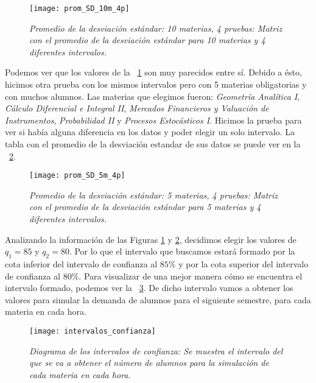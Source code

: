 \begin{figure}[H]
\centering
\texttt{[image: prom\_SD\_10m\_4p]} %
\caption[\textit{Promedio de la desviación estándar: 10 materias, 4 pruebas}]{\textit{Promedio de la desviación estándar: 10 materias, 4 pruebas: Matriz con el promedio de la desviación estándar para 10 materias y 4 diferentes intervalos.}}\label{promSD_10m_4p}
\end{figure}

Podemos ver que los valores de la \figurename{~\ref{promSD_10m_4p}} son muy parecidos entre sí. Debido a ésto, hicimos otra prueba con los mismos intervalos pero con 5 materias obligatorias y con muchos alumnos. Las materias que elegimos fueron: \textit{Geometría Analítica I}, \textit{Cálculo Diferencial e Integral II}, \textit{Mercados Financieros y Valuación de Instrumentos}, \textit{Probabilidad II} y \textit{Procesos Estocásticos I}. Hicimos la prueba para ver si había alguna diferencia en los datos y poder elegir un solo intervalo. La tabla con el promedio de la desviación estandar de sus datos se puede ver en la \figurename{~\ref{promSD_5m_4p}}.


\begin{figure}[H]
\centering
\texttt{[image: prom\_SD\_5m\_4p]} %
\caption[\textit{Promedio de la desviación estándar: 5 materias, 4 pruebas}]{\textit{Promedio de la desviación estándar: 5 materias, 4 pruebas: Matriz con el promedio de la desviación estándar para 5 materias y 4 diferentes intervalos.}}\label{promSD_5m_4p}
\end{figure}

Analizando la información de las Figuras \ref{promSD_10m_4p} y \ref{promSD_5m_4p}, decidimos elegir los valores de $q_{1} = 85$ y $q_{2} = 80$. Por lo que el intervalo que buscamos estará formado por la cota inferior del intervalo de confianza al $85\%$ y por la cota superior del intervalo de confianza al $80\%$. Para visualizar de una mejor manera cómo se encuentra el intervalo formado, podemos ver la \figurename{~\ref{interConf}}. De dicho intervalo vamos a obtener los valores para simular la demanda de alumnos para el siguiente semestre, para cada materia en cada hora.

\begin{figure}[H]
\centering
\texttt{[image: intervalos\_confianza]} %
\caption[\textit{Diagrama de los intervalos de confianza}]{\textit{Diagrama de los intervalos de confianza: Se muestra el intervalo del que se va a obtener el número de alumnos para la simulación de cada materia en cada hora.}}\label{interConf}
\end{figure}


